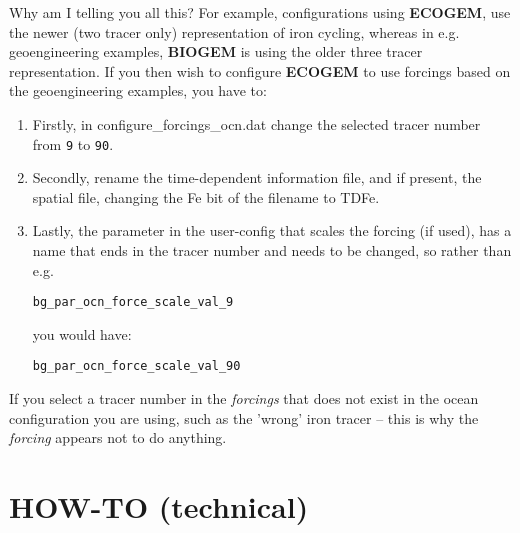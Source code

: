 \documentclass[11pt,fleqn]{book} %
\begin{document}
Why am I telling you all this? For example, configurations using \textbf{ECOGEM}, use the newer (two tracer only) representation of iron cycling, whereas in e.g. geoengineering examples, \textbf{BIOGEM} is using the older three tracer representation. If you then wish to configure \textbf{ECOGEM} to use forcings based on the geoengineering examples, you have to:

\begin{enumerate}[noitemsep]
\item Firstly, in \textsf{\footnotesize configure\_forcings\_ocn.dat} change the selected tracer number from \texttt{9} to \texttt{90}.
\item Secondly, rename the time-dependent information file, and if present, the spatial file, changing the \textsf{\footnotesize Fe} bit of the filename to \textsf{\footnotesize TDFe}.
\item Lastly, the parameter in the user-config that scales the forcing (if used), has a name that ends in the tracer number and needs to be changed, so rather than e.g.
\vspace{-1mm}\small\begin{verbatim}
bg_par_ocn_force_scale_val_9
\end{verbatim}\vspace{-1mm}\normalsize
you would have:
\vspace{-1mm}\small\begin{verbatim}
bg_par_ocn_force_scale_val_90
\end{verbatim}\vspace{-1mm}\normalsize

\end{enumerate}

If you select a tracer number in the \textit{forcings} that does not exist in the ocean configuration you are using, such as the 'wrong' iron tracer -- this is why the \textit{forcing} appears not to do anything.


\cleardoublepage


\chapter{HOW-TO (technical)}\label{how-to-technical}
\end{document}
